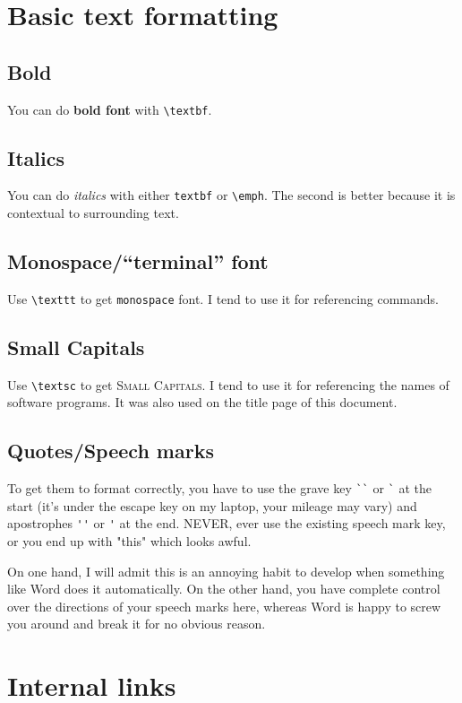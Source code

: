 \documentclass[../main]{subfiles}
\begin{document}
\section{Basic text formatting}\label{sec:basic_text}

\subsection{Bold}\label{sub:bold}
You can do \textbf{bold font} with \verb|\textbf|.

\subsection{Italics}\label{sub:emph}
You can do \emph{italics} with either \verb|textbf| or \verb|\emph|. The second is better because it is contextual to surrounding text.

\subsection{Monospace/``terminal'' font}\label{sub:tt}
Use \verb|\texttt| to get \texttt{monospace} font. I tend to use it for referencing commands.

\subsection{Small Capitals}\label{sub:sc}
Use \verb|\textsc| to get \textsc{Small Capitals}. I tend to use it for referencing the names of software programs. It was also used on the title page of this document.

\subsection{Quotes/Speech marks}\label{sub:quotes}

To get them to format correctly, you have to use the grave key \verb|``| or \verb|`| at the start (it's under the escape key on my laptop, your mileage may vary) and apostrophes \verb|''| or \verb|'| at the end. NEVER, ever use the existing speech mark key, or you end up with "this" which looks awful.

On one hand, I will admit this is an annoying habit to develop when something like Word does it automatically. On the other hand, you have complete control over the directions of your speech marks here, whereas Word is happy to screw you around and break it for no obvious reason.

\section{Internal links}\label{sec:links}
\end{document}
